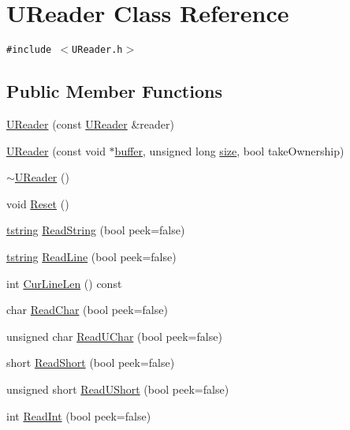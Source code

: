 \hypertarget{class_u_reader}{
\section{UReader Class Reference}
\label{class_u_reader}
}
{\tt \#include $<$UReader.h$>$}

\subsection*{Public Member Functions}
\begin{CompactItemize}
\item 
\hyperlink{class_u_reader_31b2f93dedaa0c00eb914e531c84c692}{UReader} (const \hyperlink{class_u_reader}{UReader} \&reader)
\item 
\hyperlink{class_u_reader_b7a27badfa0d9e95fa8397749103aa46}{UReader} (const void $\ast$\hyperlink{glext__bak_8h_c4fdb15bdbcd63430bab668b5419ed9f}{buffer}, unsigned long \hyperlink{glext__bak_8h_3d1e3edfcf61ca2d831883e1afbad89e}{size}, bool takeOwnership)
\item 
\hyperlink{class_u_reader_7ef65ceb8dd3ff92f929a5bfec1f7af0}{$\sim$UReader} ()
\item 
void \hyperlink{class_u_reader_25734116166238d18d24089fa2356fe2}{Reset} ()
\item 
\hyperlink{common__afx_8h_816fa58fd77499b0edb2c69ebe803d5c}{tstring} \hyperlink{class_u_reader_2c8ded1a48118dd661e60ce19a6c926a}{ReadString} (bool peek=false)
\item 
\hyperlink{common__afx_8h_816fa58fd77499b0edb2c69ebe803d5c}{tstring} \hyperlink{class_u_reader_7d6ca6cf5c7d647dc673737c30676525}{ReadLine} (bool peek=false)
\item 
int \hyperlink{class_u_reader_1e7d9ae5c4bc6ceacfd3fb14212a8d59}{CurLineLen} () const 
\item 
char \hyperlink{class_u_reader_be9fed099ce8cff9e51f52f98a862db1}{ReadChar} (bool peek=false)
\item 
unsigned char \hyperlink{class_u_reader_030cf22cdee260c158a1446a44855c32}{ReadUChar} (bool peek=false)
\item 
short \hyperlink{class_u_reader_4ddc2edc9b761259588297ef1618a68b}{ReadShort} (bool peek=false)
\item 
unsigned short \hyperlink{class_u_reader_f160454289c788bd8513882f4145399a}{ReadUShort} (bool peek=false)
\item 
int \hyperlink{class_u_reader_e30a8a2deaba30f2dc209781ea1bc16b}{ReadInt} (bool peek=false)
\item 

\end{CompactItemize}
